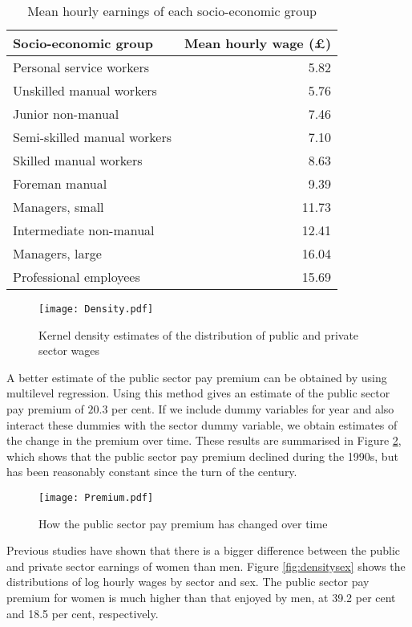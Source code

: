 \documentclass[a4paper,11pt,titlepage]{article}
\begin{document}
\begin{table}
\caption{Mean hourly earnings of each socio-economic group \label{tab:wages}}
\begin{center}
\begin{tabular}{lr}
\toprule
Socio-economic group & Mean hourly wage (\pounds)\\
\midrule
  Personal service workers & 5.82 \\
  Unskilled manual workers & 5.76 \\
  Junior non-manual & 7.46 \\
  Semi-skilled manual workers & 7.10 \\
  Skilled manual workers & 8.63 \\
  Foreman manual & 9.39 \\
  Managers, small & 11.73 \\
  Intermediate non-manual & 12.41 \\
  Managers, large & 16.04 \\
  Professional employees & 15.69 \\
\bottomrule
\end{tabular}
\end{center}
\end{table}

\begin{figure}[tb]
    \centering
    \texttt{[image: Density.pdf]}
    \caption{Kernel density estimates of the distribution of public and private sector wages\label{fig:density}}
\end{figure}

A better estimate of the public sector pay premium can be obtained by using multilevel regression.  Using this method gives an estimate of the public sector pay premium of $20.3$ per cent.  If we include dummy variables for year and also interact these dummies with the sector dummy variable, we obtain estimates of the change in the premium over time.  These results are summarised in Figure \ref{fig:premium}, which shows that the public sector pay premium declined during the 1990s, but has been reasonably constant since the turn of the century.

\begin{figure}[tb]
    \centering
    \texttt{[image: Premium.pdf]}
    \caption{How the public sector pay premium has changed over time\label{fig:premium}}
\end{figure}

Previous studies have shown that there is a bigger difference between the public and private sector earnings of women than men.  Figure \ref{fig:densitysex} shows the distributions of log hourly wages by sector and sex.  The public sector pay premium for women is much higher than that enjoyed by men, at 39.2 per cent and 18.5 per cent, respectively.
\end{document}
